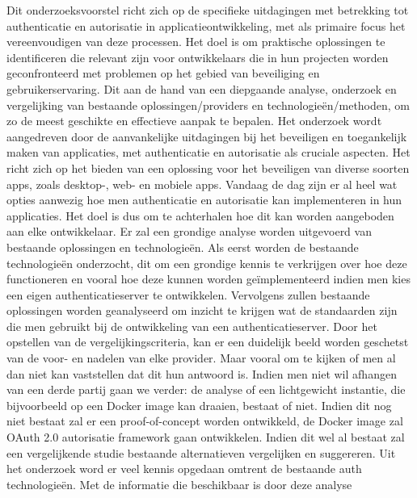 Dit onderzoeksvoorstel richt zich op de specifieke uitdagingen met betrekking tot authenticatie en autorisatie in applicatieontwikkeling, met als primaire 
focus het vereenvoudigen van deze processen. Het doel is om praktische oplossingen te identificeren die relevant zijn voor ontwikkelaars 
die in hun projecten worden geconfronteerd met problemen op het gebied van beveiliging en gebruikerservaring. Dit aan de hand van een diepgaande analyse,
onderzoek en vergelijking van bestaande oplossingen/providers en technologieën/methoden, om zo de meest geschikte en effectieve aanpak te bepalen. 
\newline
\newline
Het onderzoek wordt aangedreven door de aanvankelijke uitdagingen bij het beveiligen en toegankelijk maken van applicaties, met authenticatie en 
autorisatie als cruciale aspecten. Het richt zich op het bieden van een oplossing voor het beveiligen van diverse soorten apps, zoals desktop-, 
web- en mobiele apps. Vandaag de dag zijn er al heel wat opties aanwezig hoe men authenticatie en autorisatie kan implementeren in hun applicaties.
Het doel is dus om te achterhalen hoe dit kan worden aangeboden aan elke ontwikkelaar.
\newline
\newline
Er zal een grondige analyse worden uitgevoerd van bestaande oplossingen en technologieën. Als eerst worden de bestaande technologieën onderzocht,
dit om een grondige kennis te verkrijgen over hoe deze functioneren en vooral hoe deze kunnen worden geïmplementeerd indien men kies een eigen
authenticatieserver te ontwikkelen. Vervolgens zullen bestaande oplossingen worden geanalyseerd om inzicht te krijgen wat de standaarden zijn die
men gebruikt bij de ontwikkeling van een authenticatieserver. 
Door het opstellen van de vergelijkingscriteria, kan er een duidelijk beeld worden geschetst van de voor- en nadelen van elke provider.
Maar vooral om te kijken of men al dan niet kan vaststellen dat dit hun antwoord is.
Indien men niet wil afhangen van een derde partij gaan we verder: de analyse of een lichtgewicht instantie, die bijvoorbeeld op een Docker image
kan draaien, bestaat of niet. Indien dit nog niet bestaat zal er een proof-of-concept worden ontwikkeld, de Docker image zal OAuth 2.0
autorisatie framework gaan ontwikkelen. Indien dit wel al bestaat zal een vergelijkende studie bestaande alternatieven vergelijken en suggereren.
\newline
\newline
Uit het onderzoek word er veel kennis opgedaan omtrent de bestaande auth technologieën. Met de informatie die beschikbaar is door deze analyse
